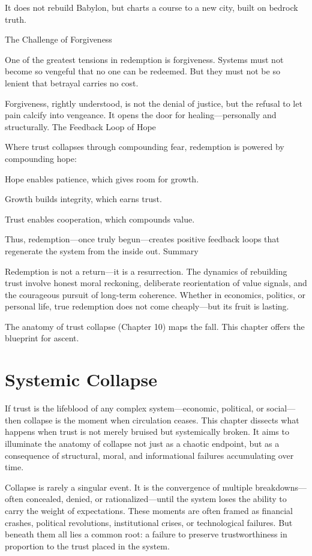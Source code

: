 \documentclass[11pt,oneside]{book}
\begin{document}
    It does not rebuild Babylon, but charts a course to a new city, built on bedrock truth.

The Challenge of Forgiveness

One of the greatest tensions in redemption is forgiveness. Systems must not become so vengeful that no one can be redeemed. But they must not be so lenient that betrayal carries no cost.

Forgiveness, rightly understood, is not the denial of justice, but the refusal to let pain calcify into vengeance. It opens the door for healing—personally and structurally.
The Feedback Loop of Hope

Where trust collapses through compounding fear, redemption is powered by compounding hope:

    Hope enables patience, which gives room for growth.

    Growth builds integrity, which earns trust.

    Trust enables cooperation, which compounds value.

Thus, redemption—once truly begun—creates positive feedback loops that regenerate the system from the inside out.
Summary

Redemption is not a return—it is a resurrection. The dynamics of rebuilding trust involve honest moral reckoning, deliberate reorientation of value signals, and the courageous pursuit of long-term coherence. Whether in economics, politics, or personal life, true redemption does not come cheaply—but its fruit is lasting.

The anatomy of trust collapse (Chapter 10) maps the fall. This chapter offers the blueprint for ascent.


\chapter{Systemic Collapse}

If trust is the lifeblood of any complex system—economic, political, or social—then collapse is the moment when circulation ceases. This chapter dissects what happens when trust is not merely bruised but systemically broken. It aims to illuminate the anatomy of collapse not just as a chaotic endpoint, but as a consequence of structural, moral, and informational failures accumulating over time.

Collapse is rarely a singular event. It is the convergence of multiple breakdowns—often concealed, denied, or rationalized—until the system loses the ability to carry the weight of expectations. These moments are often framed as financial crashes, political revolutions, institutional crises, or technological failures. But beneath them all lies a common root: a failure to preserve trustworthiness in proportion to the trust placed in the system.
\end{document}
